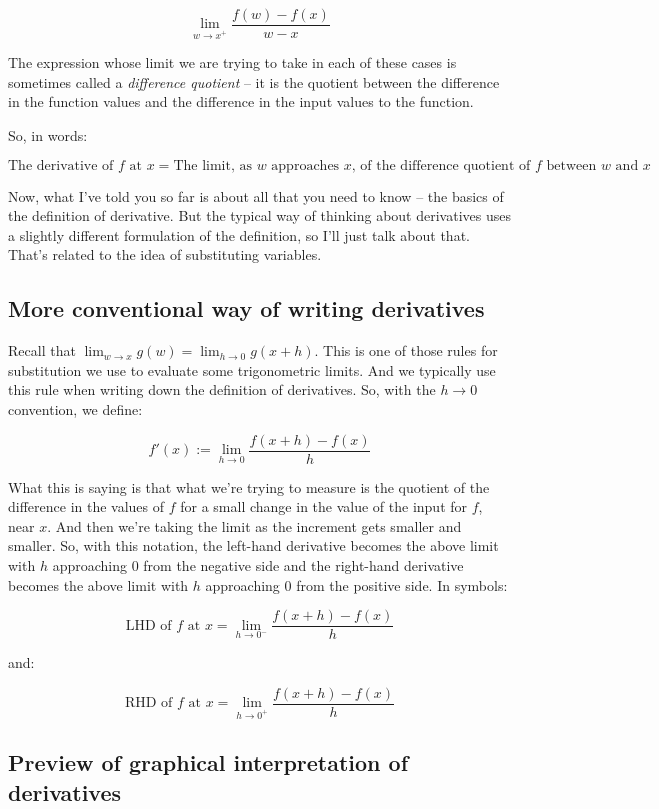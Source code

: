 \documentclass[10pt]{amsart}
\begin{document}
$$\lim_{w \to x^+} \frac{f(w) - f(x)}{w - x}$$

The expression whose limit we are trying to take in each of these
cases is sometimes called a {\em difference quotient} -- it is the
quotient between the difference in the function values and the
difference in the input values to the function.

So, in words:

\begin{equation*}
  \text{The derivative of $f$ at $x$} = \text{The limit, as $w$ approaches $x$, of the difference quotient of $f$ between $w$ and $x$}
\end{equation*}

Now, what I've told you so far is about all that you need to know --
the basics of the definition of derivative. But the typical way of
thinking about derivatives uses a slightly different formulation of
the definition, so I'll just talk about that. That's related to the
idea of substituting variables.

\subsection{More conventional way of writing derivatives}

Recall that $\lim_{w \to x} g(w) = \lim_{h \to 0} g(x + h)$. This is
one of those rules for substitution we use to evaluate some
trigonometric limits. And we typically use this rule when writing down
the definition of derivatives. So, with the $h \to 0$ convention, we
define:

$$f'(x) := \lim_{h \to 0} \frac{f(x + h) - f(x)}{h}$$

What this is saying is that what we're trying to measure is the
quotient of the difference in the values of $f$ for a small change in
the value of the input for $f$, near $x$. And then we're taking the
limit as the increment gets smaller and smaller. So, with this
notation, the left-hand derivative becomes the above limit with $h$
approaching $0$ from the negative side and the right-hand derivative
becomes the above limit with $h$ approaching $0$ from the positive
side. In symbols:

$$\text{LHD of } f \text{ at } x = \lim_{h \to 0^-} \frac{f(x + h) - f(x)}{h}$$

and:

$$\text{RHD of } f \text{ at } x = \lim_{h \to 0^+} \frac{f(x + h) - f(x)}{h}$$

\subsection{Preview of graphical interpretation of derivatives}
\end{document}
